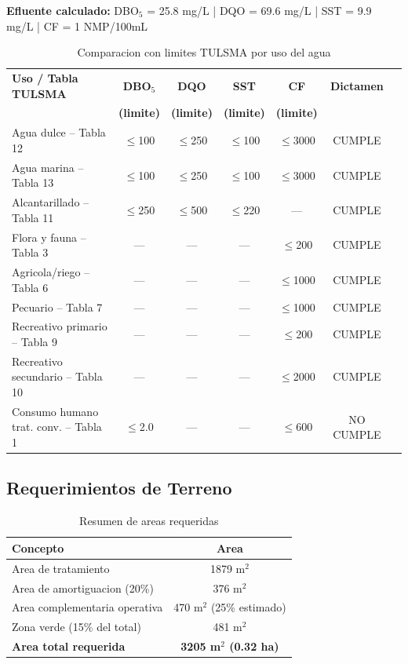 \documentclass[12pt,a4paper]{article}
\begin{document}
\textbf{Efluente calculado:} DBO$_5$ = 25.8 mg/L | DQO = 69.6 mg/L | SST = 9.9 mg/L | CF = 1 NMP/100mL

\vspace{0.5em}
\begin{table}[H]
\centering
\small
\caption{Comparacion con limites TULSMA por uso del agua}
\begin{tabular}{lcccccc}
\toprule
\textbf{Uso / Tabla TULSMA} & \textbf{DBO$_5$} & \textbf{DQO} & \textbf{SST} & \textbf{CF} & \textbf{Dictamen} \\
& \textbf{(limite)} & \textbf{(limite)} & \textbf{(limite)} & \textbf{(limite)} & \\
\midrule
Agua dulce -- Tabla 12 & $\leq$100 & $\leq$250 & $\leq$100 & $\leq$3000 & CUMPLE \\
Agua marina -- Tabla 13 & $\leq$100 & $\leq$250 & $\leq$100 & $\leq$3000 & CUMPLE \\
Alcantarillado -- Tabla 11 & $\leq$250 & $\leq$500 & $\leq$220 & --- & CUMPLE \\
Flora y fauna -- Tabla 3 & --- & --- & --- & $\leq$200 & CUMPLE \\
Agricola/riego -- Tabla 6 & --- & --- & --- & $\leq$1000 & CUMPLE \\
Pecuario -- Tabla 7 & --- & --- & --- & $\leq$1000 & CUMPLE \\
Recreativo primario -- Tabla 9 & --- & --- & --- & $\leq$200 & CUMPLE \\
Recreativo secundario -- Tabla 10 & --- & --- & --- & $\leq$2000 & CUMPLE \\
Consumo humano trat. conv. -- Tabla 1 & $\leq$2.0 & --- & --- & $\leq$600 & NO CUMPLE \\
\bottomrule
\end{tabular}
\end{table}

\subsection{Requerimientos de Terreno}

\begin{table}[H]
\centering
\caption{Resumen de areas requeridas}
\begin{tabular}{lc}
\toprule
\textbf{Concepto} & \textbf{Area} \\
\midrule
Area de tratamiento & 1879 m$^2$ \\
Area de amortiguacion (20\%) & 376 m$^2$ \\
Area complementaria operativa & 470 m$^2$ (25\% estimado) \\
Zona verde (15\% del total) & 481 m$^2$ \\
\midrule
\textbf{Area total requerida} & \textbf{3205 m$^2$ (0.32 ha)} \\
\bottomrule
\end{tabular}
\end{table}
\end{document}
